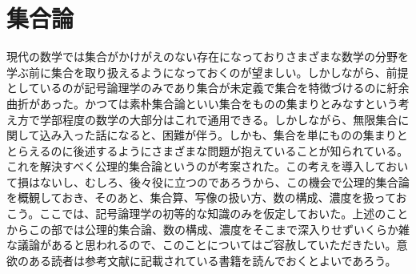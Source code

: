 \documentclass[a4paper]{jsarticle}
\begin{document}
\section{集合論}
現代の数学では集合がかけがえのない存在になっておりさまざまな数学の分野を学ぶ前に集合を取り扱えるようになっておくのが望ましい。しかしながら、前提としているのが記号論理学のみであり集合が未定義で集合を特徴づけるのに紆余曲折があった。かつては素朴集合論といい集合をものの集まりとみなすという考え方で学部程度の数学の大部分はこれで通用できる。しかしながら、無限集合に関して込み入った話になると、困難が伴う。しかも、集合を単にものの集まりととらえるのに後述するようにさまざまな問題が抱えていることが知られている。これを解決すべく公理的集合論というのが考案された。この考えを導入しておいて損はないし、むしろ、後々役に立つのであろうから、この機会で公理的集合論を概観しておき、そのあと、集合算、写像の扱い方、数の構成、濃度を扱っておこう。ここでは、記号論理学の初等的な知識のみを仮定しておいた。上述のことからこの部では公理的集合論、数の構成、濃度をそこまで深入りせずいくらか雑な議論があると思われるので、このことについてはご容赦していただきたい。意欲のある読者は参考文献に記載されている書籍を読んでおくとよいであろう。
\end{document}
